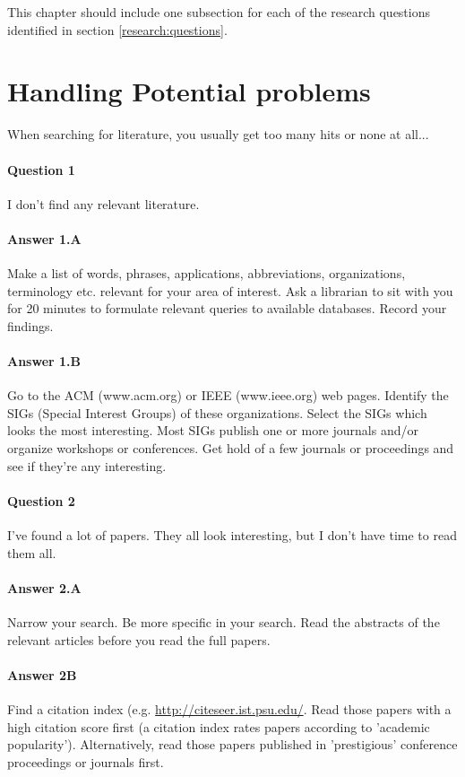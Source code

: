 \documentclass[gjovik]{gucmasterproject}
\begin{document}
This chapter should include one subsection for each of the research
questions identified in section \ref{research:questions}.  

\section{Handling Potential problems}
When searching for literature, you usually get too many hits or none at all...

\paragraph{Question 1} I don't find any relevant literature.

\paragraph{Answer 1.A}  Make a list of words, phrases, applications, abbreviations,
organizations, terminology etc. relevant for your area of interest.
Ask a librarian to sit with you for 20 minutes to formulate relevant
queries to available databases.  Record your findings.

\paragraph{Answer 1.B}  Go to the ACM (www.acm.org) or IEEE (www.ieee.org) web pages.
Identify the SIGs (Special Interest Groups) of these organizations.
Select the SIGs which looks the most interesting.
Most SIGs publish one or more journals and/or organize workshops or conferences.
Get hold of a few journals or proceedings and see if they're any interesting.


\paragraph{Question 2}  I've found a lot of papers.
They all look interesting, but I don't have time to read them all.

\paragraph{Answer 2.A}  Narrow your search.  Be more specific in your search.  Read the abstracts of the relevant articles before you read the full papers.

\paragraph{Answer 2B}  Find a citation index (e.g. \url{http://citeseer.ist.psu.edu/}.
Read those papers with a high citation score first
(a citation index rates papers according to 'academic popularity').  Alternatively,
read those papers published in 'prestigious' conference proceedings or journals first.
\end{document}
